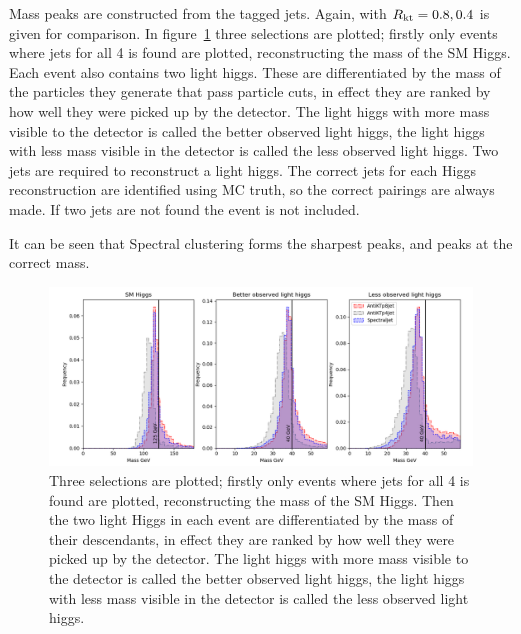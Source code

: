 
Mass peaks are constructed from the tagged jets.
Again, \antikt{} with \(R{}_\text{kt} = 0.8, 0.4\) is given for comparison.
In figure~\ref{fig:best_correct_h_allocation} three selections are plotted; firstly only events where jets for all 4  is found
are plotted, reconstructing the mass of the SM Higgs.
Each event also contains two light higgs.
These are differentiated by the mass of the particles they generate that pass particle cuts,
in effect they are ranked by how well they were picked up by the detector.
The light higgs with more mass visible to the detector is called the better observed light higgs,
the light higgs with less mass visible in the detector is called the less observed light higgs.
Two jets are required to reconstruct a light higgs.
The correct jets for each Higgs reconstruction are identified using MC truth,
so the correct pairings are always made.
If two jets are not found the event is not included.

It can be seen that Spectral clustering forms the sharpest peaks, and peaks at the correct mass.


\begin{figure}[htp]
    \includegraphics[width=1.\textwidth]{graphics/mass_peaks/light_long_correct_frequency.png}
    \caption{
Three selections are plotted; firstly only events where jets for all 4  is found
are plotted, reconstructing the mass of the SM Higgs.
Then the two light Higgs in each event are differentiated by the mass of their descendants,
in effect they are ranked by how well they were picked up by the detector.
The light higgs with more mass visible to the detector is called the better observed light higgs,
the light higgs with less mass visible in the detector is called the less observed light higgs.
    }\label{fig:best_correct_h_allocation}
\end{figure}    

